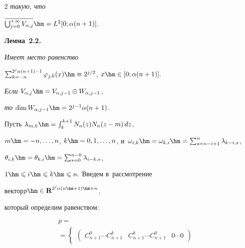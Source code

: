\begin{multicols}{2}
\textit{такую, что} 


$\overline{\bigcup\nolimits_{j=0}^{+\infty}V_{\alpha,j}}\hm={L}^2


[0;\alpha(n+1)]$.





\smallskip





\noindent


\textbf{Лемма~2.2.}\


\textit{Имеет место равенство} 


$\sum\nolimits_{k=-n}^{2^j\alpha (n+1)-1} \varphi_{j,k}(x) \hm\equiv 


2^{{j}/{2}}$, $x\hm\in [0;\alpha (n+1)].


$


\textit{Если}  $V_{\alpha ,j} \hm=V_{\alpha ,j-1} \oplus W_{\alpha ,j-1} $, 


\textit{то} $\dim W_{\alpha ,j-1}\hm =2^{j-1} \alpha (n+1)$.





\smallskip





Пусть $\lambda_{m,k}\hm=\int\nolimits_k^{k+1} N_n(z)N_n(z-m)\,dz$, 


$m\hm=-n,\ldots ,n$, $k\hm=0,1,\ldots ,n$, и~$\omega_{i,k}\hm=\omega_{k,i}


\hm=\sum\nolimits_{s=n-i+1}^n \lambda_{k-i,s}$, 


$\theta_{i,k}\hm=\theta_{k,i}\hm=\sum\nolimits_{s=0}^{n-k} \lambda_{i-k,s}$, 


$1\hm\leqslant i \hm\leqslant k \hm\leqslant n.$ Введем в~рассмотрение 


вектор\linebreak ${p}\hm\in \textbf{R}^{2^j\alpha (n\hm+1)\hm+n}$, 


который определим равенством:


\begin{multline*}




{p}={}\\


{}=\begin{cases}


 \begin{pmatrix} 


 C_{n+1}^{0} \cdots  C_{n+1}^{k}&C_{n+1}^{k} \cdots  C_{n+1}^{0}&0 \cdots 0



\end{pmatrix}
\end{cases}
\end{multline*}
\end{multicols}
